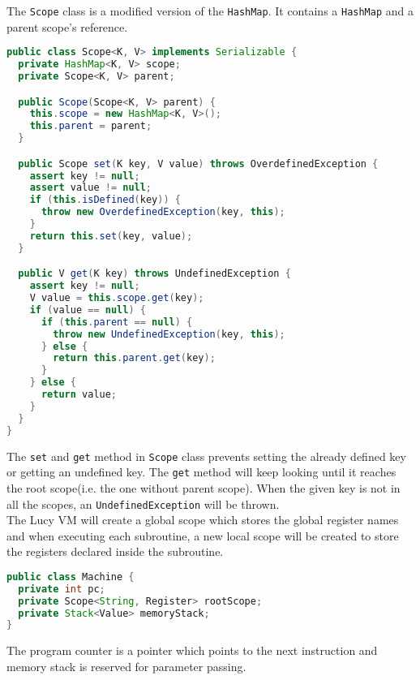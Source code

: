The \texttt{Scope} class is a modified version of the \texttt{HashMap}. It contains a \texttt{HashMap} and a parent scope's reference.
\begin{lstlisting}[language=java]
public class Scope<K, V> implements Serializable {
  private HashMap<K, V> scope;
  private Scope<K, V> parent;

  public Scope(Scope<K, V> parent) {
    this.scope = new HashMap<K, V>();
    this.parent = parent;
  }

  public Scope set(K key, V value) throws OverdefinedException {
    assert key != null;
    assert value != null;
    if (this.isDefined(key)) {
      throw new OverdefinedException(key, this);
    }
    return this.set(key, value);
  }

  public V get(K key) throws UndefinedException {
    assert key != null;
    V value = this.scope.get(key);
    if (value == null) {
      if (this.parent == null) {
        throw new UndefinedException(key, this);
      } else {
        return this.parent.get(key);
      }
    } else {
      return value;
    }
  }
}
\end{lstlisting}
The \texttt{set} and \texttt{get} method in \texttt{Scope} class prevents setting the already defined key or getting an undefined key. The \texttt{get} method will keep looking until it reaches the root scope(i.e. the one without parent scope). When the given key is not in all the scopes, an \texttt{UndefinedException} will be thrown. \\
The Lucy VM will create a global scope which stores the global register names and when executing each subroutine, a new local scope will be created to store the registers declared inside the subroutine.
\begin{lstlisting}[language=java]
public class Machine {
  private int pc;
  private Scope<String, Register> rootScope;
  private Stack<Value> memoryStack;
}
\end{lstlisting}
The program counter is a pointer which points to the next instruction and memory stack is reserved for parameter passing.


